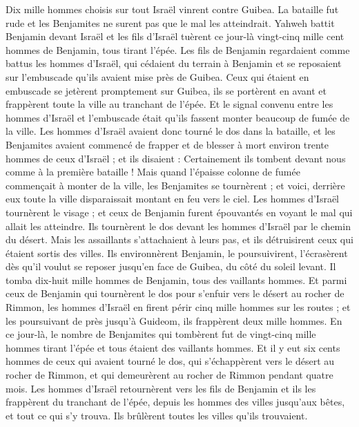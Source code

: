 \begin{multicols}{2}
Dix mille hommes choisis sur tout Israël vinrent contre Guibea. La bataille fut rude et les Benjamites ne surent pas que le mal les atteindrait.
Yahweh battit Benjamin devant Israël et les fils d'Israël tuèrent ce jour-là vingt-cinq mille cent hommes de Benjamin, tous tirant l'épée.
Les fils de Benjamin regardaient comme battus les hommes d'Israël, qui cédaient du terrain à Benjamin et se reposaient sur l'embuscade qu'ils avaient mise près de Guibea.
Ceux qui étaient en embuscade se jetèrent promptement sur Guibea, ils se portèrent en avant et frappèrent toute la ville au tranchant de l'épée.
Et le signal convenu entre les hommes d'Israël et l'embuscade était qu'ils fassent monter beaucoup de fumée de la ville.
Les hommes d'Israël avaient donc tourné le dos dans la bataille, et les Benjamites avaient commencé de frapper et de blesser à mort environ trente hommes de ceux d'Israël ; et ils disaient : Certainement ils tombent devant nous comme à la première bataille !
Mais quand l'épaisse colonne de fumée commençait à monter de la ville, les Benjamites se tournèrent ; et voici, derrière eux toute la ville disparaissait montant en feu vers le ciel.
Les hommes d'Israël tournèrent le visage ; et ceux de Benjamin furent épouvantés en voyant le mal qui allait les atteindre.
Ils tournèrent le dos devant les hommes d'Israël par le chemin du désert. Mais les assaillants s'attachaient à leurs pas, et ils détruisirent ceux qui étaient sortis des villes.
Ils environnèrent Benjamin, le poursuivirent, l'écrasèrent dès qu'il voulut se reposer jusqu'en face de Guibea, du côté du soleil levant.
Il tomba dix-huit mille hommes de Benjamin, tous des vaillants hommes.
Et parmi ceux de Benjamin qui tournèrent le dos pour s'enfuir vers le désert au rocher de Rimmon, les hommes d'Israël en firent périr cinq mille hommes sur les routes ; et les poursuivant de près jusqu'à Guideom, ils frappèrent deux mille hommes.
En ce jour-là, le nombre de Benjamites qui tombèrent fut de vingt-cinq mille hommes tirant l'épée et tous étaient des vaillants hommes.
Et il y eut six cents hommes de ceux qui avaient tourné le dos, qui s'échappèrent vers le désert au rocher de Rimmon, et qui demeurèrent au rocher de Rimmon pendant quatre mois.
Les hommes d'Israël retournèrent vers les fils de Benjamin et ils les frappèrent du tranchant de l'épée, depuis les hommes des villes jusqu'aux bêtes, et tout ce qui s'y trouva. Ils brûlèrent toutes les villes qu'ils trouvaient.

\end{multicols}
